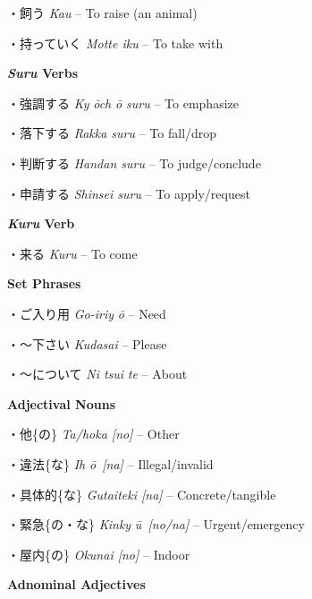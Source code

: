 \par{・飼う  \emph{Kau }– To raise (an animal) }
 
\par{・持っていく  \emph{Motte iku }– To take with }
 
\par{\textbf{\emph{Suru }Verbs }}
 
\par{・強調する  \emph{Ky }\emph{ōch }\emph{ō suru }– To emphasize }
 
\par{・落下する  \emph{Rakka suru }– To fall\slash drop }
 
\par{・判断する  \emph{Handan suru }– To judge\slash conclude }
 
\par{・申請する  \emph{Shinsei suru }– To apply\slash request }
 
\par{\textbf{\emph{Kuru }Verb }}
 
\par{・来る \emph{Kuru }– To come }
 
\par{\textbf{Set Phrases }}
 
\par{・ご入り用  \emph{Go-iriy }\emph{ō }– Need }
 
\par{・～下さい  \emph{Kudasai }– Please }

\par{ ・～について  \emph{Ni tsui }\emph{te }– About }

\par{\textbf{Adjectival Nouns }\emph{\hfill\break
}}

\par{・他\{の\} \emph{Ta\slash hoka [no] }– Other }

\par{・違法\{な\} \emph{Ih }\emph{ō [na] }– Illegal\slash invalid }

\par{・具体的\{な\}  \emph{Gutaiteki [na] }– Concrete\slash tangible }

\par{・緊急\{の・な\}  \emph{Kinky }\emph{ū [no\slash na] }– Urgent\slash emergency }

\par{・屋内\{の\} \emph{Okunai [no] }– Indoor }

\par{\textbf{Adnominal Adjectives }}

